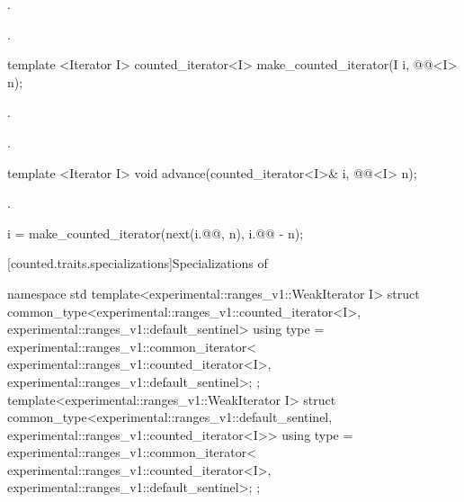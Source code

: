\begin{addedblock}
\begin{itemdescr}
\pnum
\requires {}.

\pnum
{}
.
\end{itemdescr}

%
\begin{itemdecl}
template <Iterator I>
  counted_iterator<I> make_counted_iterator(I i, @@<I> n);
\end{itemdecl}

\begin{itemdescr}
\pnum
\requires {}.

\pnum
\returns {}.
\end{itemdescr}

%
\begin{itemdecl}
template <Iterator I>
  void advance(counted_iterator<I>& i, @@<I> n);
\end{itemdecl}

\begin{itemdescr}
\pnum
\requires {}.

\pnum
\effects
\begin{codeblock}
i = make_counted_iterator(next(i.@@, n), i.@@ - n);
\end{codeblock}
\end{itemdescr}

{\color{oldclr}
[counted.traits.specializations]{Specializations of }

%
\begin{itemdecl}
namespace std {
  template<experimental::ranges_v1::WeakIterator I>
  struct common_type<experimental::ranges_v1::counted_iterator<I>,
                     experimental::ranges_v1::default_sentinel> {
    using type = experimental::ranges_v1::common_iterator<
      experimental::ranges_v1::counted_iterator<I>,
      experimental::ranges_v1::default_sentinel>;
  };
  template<experimental::ranges_v1::WeakIterator I>
  struct common_type<experimental::ranges_v1::default_sentinel,
                     experimental::ranges_v1::counted_iterator<I>> {
    using type = experimental::ranges_v1::common_iterator<
      experimental::ranges_v1::counted_iterator<I>,
      experimental::ranges_v1::default_sentinel>;
  };
}
\end{itemdecl}

}
\end{addedblock}
